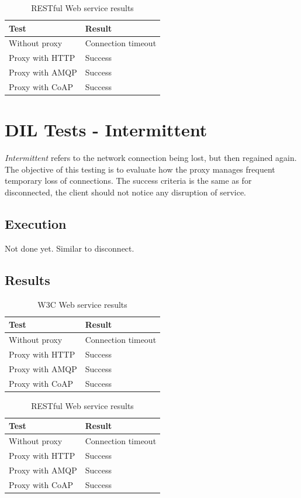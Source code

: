 \begin{table}[h!]
\begin{tabular}{| l | l |}
\hline
  \textbf{Test} & \textbf{Result} \\ \hline
  Without proxy & Connection timeout \\ \hline
  Proxy with HTTP & Success \\ \hline
  Proxy with AMQP & Success \\ \hline
  Proxy with CoAP & Success \\ \hline
\end{tabular}
\caption{RESTful Web service results}
\end{table}



\section{DIL Tests - Intermittent}

\textit{Intermittent} refers to the network connection being lost, but then
regained again. The objective of this testing is to evaluate how the proxy
manages frequent temporary loss of connections. The success criteria is the same
as for disconnected, the client should not notice any disruption of service.

\subsection{Execution}

Not done yet. Similar to disconnect.

\subsection{Results}

\begin{table}[H]
\begin{tabular}{| l | l |}
\hline
  \textbf{Test} & \textbf{Result} \\ \hline
  Without proxy & Connection timeout \\ \hline
  Proxy with HTTP & Success \\ \hline
  Proxy with AMQP & Success \\ \hline
  Proxy with CoAP & Success \\ \hline
\end{tabular}
\caption{W3C Web service results}
\end{table}

\begin{table}[H]
\begin{tabular}{| l | l |}
\hline
  \textbf{Test} & \textbf{Result} \\ \hline
  Without proxy & Connection timeout \\ \hline
  Proxy with HTTP & Success \\ \hline
  Proxy with AMQP & Success \\ \hline
  Proxy with CoAP & Success \\ \hline
\end{tabular}
\caption{RESTful Web service results}
\end{table}

